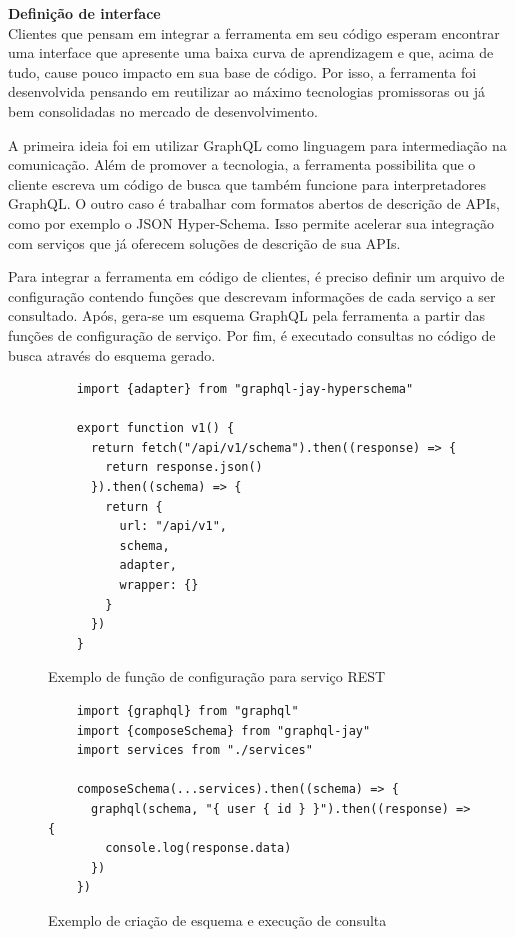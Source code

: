 \textbf{Definição de interface} \\

Clientes que pensam em integrar a ferramenta em seu código esperam encontrar uma interface que apresente uma baixa curva de aprendizagem e que, acima de tudo, cause pouco impacto em sua base de código. Por isso, a ferramenta foi desenvolvida pensando em reutilizar ao máximo tecnologias promissoras ou já bem consolidadas no mercado de desenvolvimento.

A primeira ideia foi em utilizar GraphQL como linguagem para intermediação na comunicação. Além de promover a tecnologia, a ferramenta possibilita que o cliente escreva um código de busca que também funcione para interpretadores GraphQL. O outro caso é trabalhar com formatos abertos de descrição de APIs, como por exemplo o JSON Hyper-Schema. Isso permite acelerar sua integração com serviços que já oferecem soluções de descrição de sua APIs.

Para integrar a ferramenta em código de clientes, é preciso definir um arquivo de configuração contendo funções que descrevam informações de cada serviço a ser consultado. Após, gera-se um esquema GraphQL pela ferramenta a partir das funções de configuração de serviço. Por fim, é executado consultas no código de busca através do esquema gerado.

\begin{figure}[H]
  \centering
  \begin{verbatim}
    import {adapter} from "graphql-jay-hyperschema"
  
    export function v1() {
      return fetch("/api/v1/schema").then((response) => {
        return response.json()
      }).then((schema) => {
        return {
          url: "/api/v1",
          schema,
          adapter,
          wrapper: {}
        }
      })
    }
  \end{verbatim}
  \caption{Exemplo de função de configuração para serviço REST}
\end{figure}

\begin{figure}[H]
  \centering
  \begin{verbatim}
    import {graphql} from "graphql"
    import {composeSchema} from "graphql-jay"
    import services from "./services"
    
    composeSchema(...services).then((schema) => {
      graphql(schema, "{ user { id } }").then((response) => { 
        console.log(response.data)
      })
    })
  \end{verbatim}
  \caption{Exemplo de criação de esquema e execução de consulta}
\end{figure}


